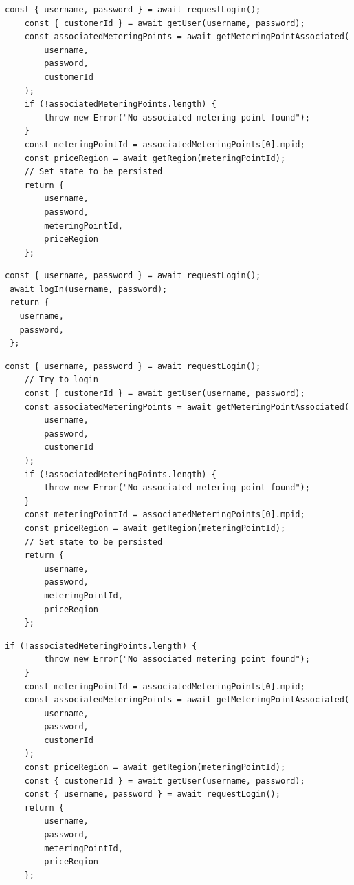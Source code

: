 \documentclass[jou,apacite]{apa6}
\begin{document}
\begin{lstlisting}[caption=Comparison 6a - Real integration connect bodies]
    const { username, password } = await requestLogin();
    const { customerId } = await getUser(username, password);
    const associatedMeteringPoints = await getMeteringPointAssociated(
        username,
        password,
        customerId
    );
    if (!associatedMeteringPoints.length) {
        throw new Error("No associated metering point found");
    }
    const meteringPointId = associatedMeteringPoints[0].mpid;
    const priceRegion = await getRegion(meteringPointId);
    // Set state to be persisted
    return {
        username,
        password,
        meteringPointId,
        priceRegion
    };
\end{lstlisting}

\begin{lstlisting}[caption=Comparison 6b - Real integration connect bodies]
 const { username, password } = await requestLogin();
 await logIn(username, password);
 return {
   username,
   password,
 };
\end{lstlisting}

\begin{lstlisting}[caption=Comparison 7a - Real integration against order scrambled integration]
	const { username, password } = await requestLogin();
	// Try to login
	const { customerId } = await getUser(username, password);
	const associatedMeteringPoints = await getMeteringPointAssociated(
		username,
		password,
		customerId
	);
	if (!associatedMeteringPoints.length) {
		throw new Error("No associated metering point found");
	}
	const meteringPointId = associatedMeteringPoints[0].mpid;
	const priceRegion = await getRegion(meteringPointId);
	// Set state to be persisted
	return {
		username,
		password,
		meteringPointId,
		priceRegion
	};
\end{lstlisting}

\begin{lstlisting}[caption=Comparison 7b - Real integration against order scrambled integration]
	if (!associatedMeteringPoints.length) {
		throw new Error("No associated metering point found");
	}
	const meteringPointId = associatedMeteringPoints[0].mpid;
	const associatedMeteringPoints = await getMeteringPointAssociated(
		username,
		password,
		customerId
	);
	const priceRegion = await getRegion(meteringPointId);
	const { customerId } = await getUser(username, password);
	const { username, password } = await requestLogin();
	return {
		username,
		password,
		meteringPointId,
		priceRegion
	};
\end{lstlisting}
\end{document}
